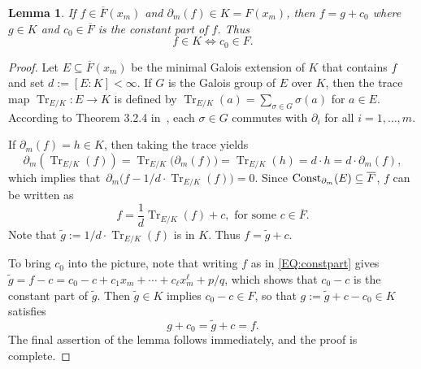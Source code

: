 \documentclass{amsart}
\newtheorem{lem}[thm]{Lemma}
\theoremstyle{definition}
\numberwithin{equation}{section}
\numberwithin{thm}{section}
\newcommand{\Const}{\text{\rm Const}}
\begin{document}
\begin{lem}
\label{LEM:constant}
If $f \in \overline{F}(x_m)$ and $\partial_m(f) \in K = F(x_m)$, then
 $f = g + c_0$ where $g \in K$ and $c_0 \in \overline{F}$ is the constant part of $f$.  Thus
 \[
 f \in K \iff c_0 \in F.
 \]
\end{lem}

\begin{proof}
	Let $E \subseteq \overline{F}(x_m)$ be the minimal Galois extension of $K$ that contains $f$ and set $d := [E : K] < \infty$.   If $G$ is the Galois group of $E$ over $K$,
then the trace map $\operatorname{Tr}_{E/K} \colon E \rightarrow K$ is defined by $\operatorname{Tr}_{E/K}(a) = \sum_{\sigma \in G} \sigma(a)$ for $a\in E$.
According to Theorem 3.2.4 in~\cite{Bronstein}, each $\sigma\in G$ commutes with $\partial_i$ for all $i  = 1,\ldots,m$.
	
If $\partial_m(f) = h \in K$, then taking the trace yields
\[
\partial_m(\operatorname{Tr}_{E/K}(f)) = \operatorname{Tr}_{E/K} \big(\partial_m(f)\big) = \operatorname{Tr}_{E/K}(h) = d \cdot h = d \cdot \partial_m(f),
\]
which implies that~$\partial_m\big( f - 1/d \cdot\operatorname{Tr}_{E/K}(f) \big) = 0$.
Since $\Const_{\partial_m}(E) \subseteq \overline{F}$, $f$ can be written as
\[
f = \frac{1}{d}\operatorname{Tr}_{E/K}(f) + c,\text{ for some } c \in \overline{F}.
\] 
Note that $\tilde{g} := 1/d \cdot \operatorname{Tr}_{E/K}(f)$ is in $K$. Thus $f =\tilde{g}+c$.

To bring $c_0$ into the picture, note that writing $f$ as in \eqref{EQ:constpart} gives $\tilde{g} = f - c =  c_0 - c +  c_1 x_m +\cdots + c_\ell x_m^\ell + p/q$, which shows that $c_0 - c$ is the constant part of $\tilde{g}$.  Then $\tilde{g} \in K$ implies $c_0 - c \in F$, so that $g := \tilde{g} + c - c_0 \in K$ satisfies
\[
g + c_0 = \tilde{g} + c = f.
\]
The final assertion of the lemma follows immediately, and the proof is complete.
\end{proof}
\end{document}
